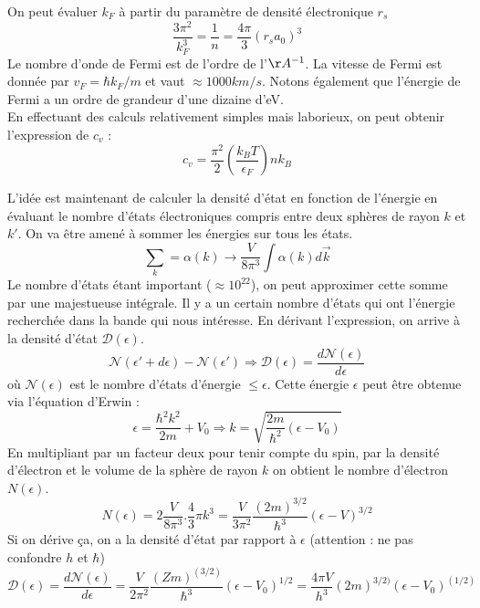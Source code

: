 On peut évaluer $k_F$ à partir du paramètre de densité électronique 
$r_s$ 
\begin{equation}
\frac{3\pi^2}{k_F^3} = \frac{1}{n} = \frac{4\pi}{3}(r_sa_0)^3
\end{equation}
Le nombre d'onde de Fermi est de l'ordre de l'$\AA^{-1}$. La vitesse
de Fermi est donnée par $v_F = \hbar k_F/m$ et vaut $\approx 1000km/s$. 
Notons également que l'énergie de Fermi a un ordre de grandeur d'une 
dizaine d'eV.\\

En effectuant des calculs relativement simples mais laborieux, on 
peut obtenir l'expression de $c_v$ :
\begin{equation}
c_v = \frac{\pi^2}{2}\left(\frac{k_BT}{\epsilon_F}\right)nk_B
\end{equation}

L'idée est maintenant de calculer la densité d'état en fonction de 
l'énergie en évaluant le nombre d'états électroniques compris entre 
deux sphères de rayon $k$ et $k'$. On va être amené à sommer les 
énergies sur tous les états.
\begin{equation}
\sum_k = \alpha(k) \rightarrow \frac{V}{8\pi^3}\int\alpha(k)d\vec{k}
\end{equation}
Le nombre d'états étant important ($\approx 10^{22}$), on peut 
approximer cette somme par une majestueuse intégrale. Il y a un certain 
nombre d'états qui ont l'énergie recherchée dans la bande 
qui nous intéresse. En dérivant l'expression, on arrive à la densité 
d'état $\mathcal{D}(\epsilon)$.
\begin{equation}
\mathcal{N}(\epsilon'+d\epsilon)
-\mathcal{N}(\epsilon') \Longrightarrow \mathcal{D}(\epsilon) = 
\frac{d\mathcal{N}(\epsilon)}{d\epsilon}
\end{equation}
où $\mathcal{N}(\epsilon)$ est le nombre d'états d'énergie $\leq 
\epsilon$. Cette énergie $\epsilon$ peut être obtenue via l'équation 
d'Erwin :
\begin{equation}
\epsilon = \frac{\hbar^2k^2}{2m} + V_0 \Longrightarrow k = \sqrt{
\frac{2m}{\hbar^2}(\epsilon-V_0)}
\end{equation}
En multipliant par un facteur deux pour tenir compte du spin, par la 
densité d'électron et le volume de la sphère de rayon $k$ on obtient 
le nombre d'électron $N(\epsilon)$.
\begin{equation}
N(\epsilon) = 2 \frac{V}{8\pi^3}.\frac{4}{3}\pi k^3 = \frac{V}{3\pi^2}
\frac{(2m)^{3/2}}{\hbar^3}(\epsilon-V)^{3/2}
\end{equation}
Si on dérive ça, on a la densité d'état par rapport à $\epsilon$ 
(attention : ne pas confondre $h$ et $\hbar$)
\begin{equation}
\mathcal{D}(\epsilon) = \frac{d\mathcal{N}(\epsilon)}{d\epsilon}= 
\frac{V}{2\pi^2}\frac{(Zm)^{(3/2)}}{\hbar^3}(\epsilon-V_0)^{1/2} = 
\frac{4\pi V}{h^3} (2m)^{3/2)}(\epsilon-V_0)^{(1/2)}
\end{equation}

